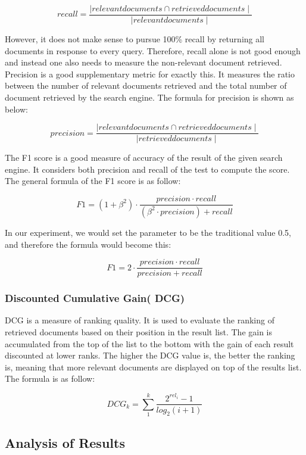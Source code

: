 \[recall=\frac{\mid relevant documents\cap retrieved documents\mid}{\mid relevant documents \mid}\]

However, it does not make sense to pursue 100\% recall by returning all documents in response to every query. Therefore, recall alone is not good enough and instead one also needs to measure the non-relevant document retrieved. Precision is a good supplementary metric for exactly this. It measures the ratio between the number of relevant documents retrieved and the total number of document retrieved by the search engine. The formula for precision is shown as below:

\[precision=\frac{\mid relevant documents\cap retrieved documents\mid}{\mid retrieved documents \mid}\]

The F1 score is a good measure of accuracy of the result of the given search engine. It considers both precision and recall of the test to compute the score. The general formula of the F1 score is as follow:

\[F1=(1+\beta^{2})\cdot \frac{precision\cdot recall}{(\beta^{2}\cdot precision)+recall}\]

In our experiment, we would set the parameter to be the traditional value 0.5, and therefore the formula would become this:

\[F1=2\cdot \frac{precision \cdot recall}{precision+recall}\]

\subsubsection{Discounted Cumulative Gain( DCG)}

DCG is a measure of ranking quality. It is used to evaluate the ranking of retrieved documents based on their position in the result list. The gain is accumulated from the top of the list to the bottom with the gain of each result discounted at lower ranks. The higher the DCG value is, the better the ranking is, meaning that more relevant documents are displayed on top of the results list. The formula is as follow:

\[DCG_{k}=\sum_1^k \frac{2^{rel_{i}}-1}{log_{2}(i+1)}\]


\subsection{Analysis of Results} %
\label{sub:analysis_of_results}

